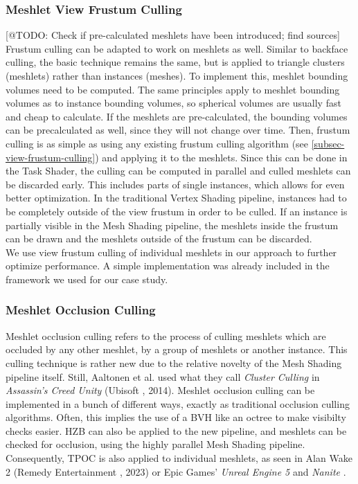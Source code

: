 \subsubsection{Meshlet View Frustum Culling} \label{subsubsec-meshlet-view-frustum-culling}

[@TODO: Check if pre-calculated meshlets have been introduced; find sources]
Frustum culling can be adapted to work on meshlets as well. Similar to backface culling, the basic technique remains 
the same, but is applied to triangle clusters (meshlets) rather than instances (meshes). To implement this, meshlet 
bounding volumes need to be computed. The same principles apply to meshlet bounding volumes as to instance bounding 
volumes, so spherical volumes are usually fast and cheap to calculate. If the meshlets are pre-calculated, the 
bounding volumes can be precalculated as well, since they will not change over time. Then, frustum culling is as simple 
as using any existing frustum culling algorithm (see \ref{subsec-view-frustum-culling}) and applying it to the meshlets.
Since this can be done in the Task Shader, the culling can be computed in parallel and culled meshlets can be discarded 
early. This includes parts of single instances, which allows for even better optimization. In the traditional Vertex 
Shading pipeline, instances had to be completely outside of the view frustum in order to be culled. If an instance is 
partially visible in the Mesh Shading pipeline, the meshlets inside the frustum can be drawn and the meshlets outside 
of the frustum can be discarded. \\

\noindent
We use view frustum culling of individual meshlets in our approach to further optimize performance. A simple 
implementation was already included in the framework we used for our case study.

\subsubsection{Meshlet Occlusion Culling} \label{subsubsec-meshlet-occlusion-culling}

Meshlet occlusion culling refers to the process of culling meshlets which are occluded by any other meshlet, by a 
group of meshlets or another instance. This culling technique is rather new due to the relative novelty of the 
Mesh Shading pipeline itself. Still, Aaltonen et al. \cite{Aaltonen2015} used what they call \emph{Cluster Culling} in 
\emph{Assassin's Creed Unity} (Ubisoft \cite{Ubisoft2014}, 2014). Meshlet occlusion culling can be implemented in 
a bunch of different ways, exactly as traditional occlusion culling algorithms. Often, this implies the use of a 
\ac{BVH} like an octree to make visibilty checks easier. \ac{HZB} can also be applied to the new pipeline, and meshlets 
can be checked for occlusion, using the highly parallel Mesh Shading pipeline. Consequently, \ac{TPOC} is also applied 
to individual meshlets, as seen in Alan Wake 2 (Remedy Entertainment \cite{Remedy2023}, 2023) or Epic Games' 
\emph{Unreal Engine 5} and \emph{Nanite} \cite{Karis2021}.\\

